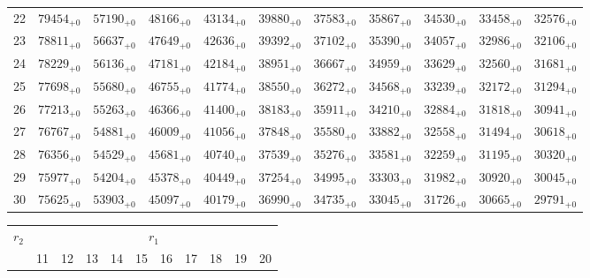 \documentclass[10pt, a4paper]{article}
\begin{document}
\begin{center}
\begin{tabular}{c || c c c c c | c c c c c}
        22 & \({79454}_{+0}\) & \({57190}_{+0}\) & \({48166}_{+0}\) & \({43134}_{+0}\) & \({39880}_{+0}\) & \({37583}_{+0}\) & \({35867}_{+0}\) & \({34530}_{+0}\) & \({33458}_{+0}\) & \({32576}_{+0}\)\\
        23 & \({78811}_{+0}\) & \({56637}_{+0}\) & \({47649}_{+0}\) & \({42636}_{+0}\) & \({39392}_{+0}\) & \({37102}_{+0}\) & \({35390}_{+0}\) & \({34057}_{+0}\) & \({32986}_{+0}\) & \({32106}_{+0}\)\\
        24 & \({78229}_{+0}\) & \({56136}_{+0}\) & \({47181}_{+0}\) & \({42184}_{+0}\) & \({38951}_{+0}\) & \({36667}_{+0}\) & \({34959}_{+0}\) & \({33629}_{+0}\) & \({32560}_{+0}\) & \({31681}_{+0}\)\\
        25 & \({77698}_{+0}\) & \({55680}_{+0}\) & \({46755}_{+0}\) & \({41774}_{+0}\) & \({38550}_{+0}\) & \({36272}_{+0}\) & \({34568}_{+0}\) & \({33239}_{+0}\) & \({32172}_{+0}\) & \({31294}_{+0}\)\\
        \hline
        26 & \({77213}_{+0}\) & \({55263}_{+0}\) & \({46366}_{+0}\) & \({41400}_{+0}\) & \({38183}_{+0}\) & \({35911}_{+0}\) & \({34210}_{+0}\) & \({32884}_{+0}\) & \({31818}_{+0}\) & \({30941}_{+0}\)\\
        27 & \({76767}_{+0}\) & \({54881}_{+0}\) & \({46009}_{+0}\) & \({41056}_{+0}\) & \({37848}_{+0}\) & \({35580}_{+0}\) & \({33882}_{+0}\) & \({32558}_{+0}\) & \({31494}_{+0}\) & \({30618}_{+0}\)\\
        28 & \({76356}_{+0}\) & \({54529}_{+0}\) & \({45681}_{+0}\) & \({40740}_{+0}\) & \({37539}_{+0}\) & \({35276}_{+0}\) & \({33581}_{+0}\) & \({32259}_{+0}\) & \({31195}_{+0}\) & \({30320}_{+0}\)\\
        29 & \({75977}_{+0}\) & \({54204}_{+0}\) & \({45378}_{+0}\) & \({40449}_{+0}\) & \({37254}_{+0}\) & \({34995}_{+0}\) & \({33303}_{+0}\) & \({31982}_{+0}\) & \({30920}_{+0}\) & \({30045}_{+0}\)\\
        30 & \({75625}_{+0}\) & \({53903}_{+0}\) & \({45097}_{+0}\) & \({40179}_{+0}\) & \({36990}_{+0}\) & \({34735}_{+0}\) & \({33045}_{+0}\) & \({31726}_{+0}\) & \({30665}_{+0}\) & \({29791}_{+0}\)\\
        \hline
    \end{tabular}
    \pagebreak
    \begin{tabular}{c || c c c c c | c c c c c}
        \multirow{2}{*}{\(r_2\)} & \multicolumn{10}{c}{\(r_1\)} \\
        & 11 & 12 & 13 & 14 & 15 & 16 & 17 & 18 & 19 & 20\\
        \hline\hline

\end{tabular}
\end{center}
\end{document}
